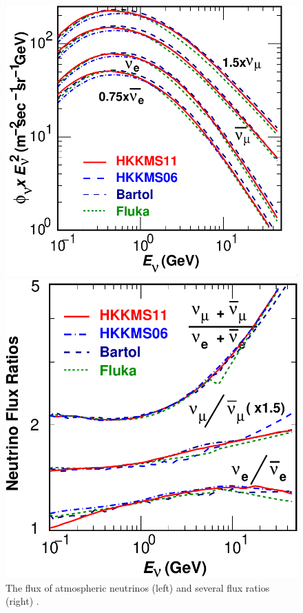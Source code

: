 \documentclass[preprint,12pt]{elsarticle}
\begin{document}
\begin{figure}[htbp]
\begin{minipage}[c]{.46\linewidth}
   	      \includegraphics[width=0.9\linewidth]{figures/fig7a-c.pdf}
   \end{minipage} \hfill
   \begin{minipage}{.46\linewidth}
      \includegraphics[width=0.9\linewidth]{figures/fig7b-c.pdf}
   \end{minipage}
    \caption{The flux of atmospheric neutrinos (left) and several flux ratios (right) \cite{ref:midori}. }
 \label{fig:nuatmflux}
\end{figure}
\end{document}
